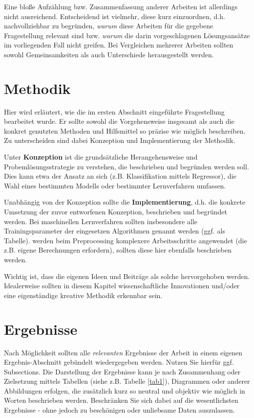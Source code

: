 \documentclass{svproc}
\begin{document}
Eine bloße Aufzählung bzw. Zusammenfassung anderer Arbeiten ist allerdings nicht ausreichend. Entscheidend ist vielmehr, diese kurz einzuordnen, d.h. nachvollziehbar zu begründen, \textit{warum} diese Arbeiten für die gegebene Fragestellung relevant sind bzw. \textit{warum} die darin vorgeschlagenen Lösungsansätze im vorliegenden Fall nicht greifen. Bei Vergleichen mehrerer Arbeiten sollten sowohl Gemeinsamkeiten als auch Unterschiede herausgestellt werden.  
%
%
\section{Methodik}
%
Hier wird erläutert, wie die im ersten Abschnitt eingeführte Fragestellung bearbeitet wurde. Er sollte sowohl die Vorgehensweise insgesamt als auch die konkret genutzten Methoden und Hilfsmittel so präzise wie möglich beschreiben. Zu unterscheiden sind dabei Konzeption und Implementierung der Methodik.

Unter \textbf{Konzeption} ist die grundsätzliche Herangehensweise und Probem\-lös\-ungsstrategie zu verstehen, die beschrieben und begründen werden soll. Dies kann etwa der Ansatz an sich (z.B. Klassifikation mittels Regressor), die Wahl eines bestimmten Modells oder bestimmter Lernverfahren umfassen. 

Unabhängig von der Konzeption sollte die \textbf{Implementierung}, d.h. die konkrete Umsetzung der zuvor entworfenen Konzeption, beschrieben und begründet werden. Bei maschinellen Lernverfahren sollten insbesondere alle Trainingsparameter der eingesetzen Algorithmen genannt werden (ggf. als Tabelle). werden beim Preprocessing komplexere Arbeitsschritte angewendet (die z.B. eigene Berechnungen erfordern), sollten diese hier ebenfalls beschrieben werden.

Wichtig ist, dass die eigenen Ideen und Beiträge als solche hervorgehoben werden. Idealerweise sollten in diesem Kapitel wissenschaftliche Innovationen und/oder eine eigenständige kreative Methodik erkennbar sein. 
%
%
\section{Ergebnisse}
%
Nach Möglichkeit sollten alle \textit{relevanten} Ergebnisse der Arbeit in einem eigenen Ergebnis-Abschnitt gebündelt wiedergegeben werden. Nutzen Sie hierfür ggf. Subsections. Die Darstellung der Ergebnisse kann je nach Zusammenhang oder Zielsetzung mittels Tabellen (siehe z.B. Tabelle \ref{tab1}), Diagrammen oder anderer Abbildungen erfolgen, die zusätzlich kurz so neutral und objektiv wie möglich in Worten beschrieben werden. Beschränken Sie sich dabei auf die wesentlichsten Ergebnisse - ohne jedoch zu beschönigen oder unliebsame Daten auszulassen. 
\end{document}

